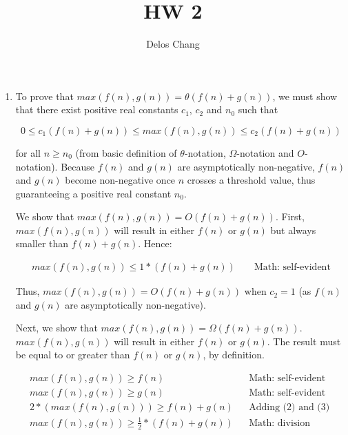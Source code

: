 \documentclass[a4paper]{report}
\title{HW 2}
\author{Delos Chang}
\begin{document}
  \maketitle

  \begin{enumerate}
    \item To prove that $max(f(n),g(n)) = \theta (f(n) + g(n))$, we must show that there exist positive real constants $c_{1}$, $c_{2}$ and $n_{0}$ such that

      $$0 \leq c_{1}(f(n) + g(n)) \leq max(f(n),g(n)) \leq c_{2}(f(n) + g(n))$$
    
    for all $n \geq n_{0}$ (from basic definition of $\theta$-notation, $\Omega$-notation and $O$-notation). 
    Because $f(n)$ and $g(n)$ are asymptotically non-negative, $f(n)$ and $g(n)$ become non-negative once $n$ crosses a threshold value, thus guaranteeing a positive real constant $n_{0}$.

    We show that $max(f(n), g(n)) = O(f(n) + g(n))$.
    First, $max(f(n), g(n))$ will result in either $f(n)$ or $g(n)$ but always smaller than $f(n) + g(n)$. Hence:

    \begin{align}
      max(f(n), g(n)) \leq 1 * (f(n) + g(n))              &&\text{ Math: self-evident}
    \end{align}

    Thus, $max(f(n), g(n)) = O(f(n) + g(n))$ when $c_{2} = 1$ (as $f(n)$ and $g(n)$ are asymptotically non-negative). 

    Next, we show that $max(f(n), g(n)) = \Omega(f(n) + g(n))$. $max(f(n), g(n))$ will result in either $f(n)$ or $g(n)$. The result must be equal to or greater than $f(n)$ or $g(n)$, by definition.

    \begin{align}
      max(f(n), g(n)) \geq  f(n)                          &&\text{Math: self-evident}\\
      max(f(n), g(n)) \geq  g(n)                          &&\text{Math: self-evident}\\
      2 * (max(f(n),g(n))) \geq f(n) + g(n)               &&\text{Adding (2) and (3) }\\
      max(f(n),g(n)) \geq \frac{1}{2}*(f(n) + g(n))       &&\text{Math: division}
    \end{align}


\end{enumerate}
\end{document}
